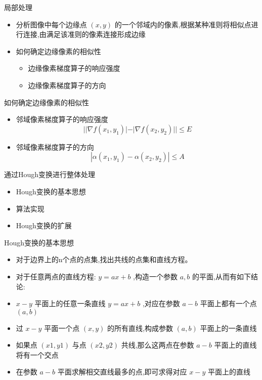 \documentclass[presentation]{beamer}
\begin{document}
\begin{frame}[label={sec:orgb7e85b8}]{局部处理}
\begin{itemize}
\item 分析图像中每个边缘点 \((x,y)\) 的一个邻域内的像素,根据某种准则将相似点进行连接,由满足该准则的像素连接形成边缘
\item 如何确定边缘像素的相似性
\begin{itemize}
\item 边缘像素梯度算子的响应强度
\item 边缘像素梯度算子的方向
\end{itemize}
\end{itemize}
\end{frame}
\begin{frame}[label={sec:org2362c99}]{如何确定边缘像素的相似性}
\begin{itemize}
\item 邻域像素梯度算子的响应强度
\[ ||\nabla f(x_1,y_1)|-|\nabla f(x_2,y_2)||\leq E \]
\item 邻域像素梯度算子的方向
\[ |\alpha(x_1,y_1)-\alpha(x_2,y_2)|\leq A  \]
\end{itemize}
\end{frame}

\begin{frame}[label={sec:org539962a}]{通过Hough变换进行整体处理}
\begin{itemize}
\item Hough变换的基本思想
\item 算法实现
\item Hough变换的扩展
\end{itemize}
\end{frame}

\begin{frame}[label={sec:orgce80d19}]{Hough变换的基本思想}
\begin{itemize}
\item 对于边界上的n个点的点集,找出共线的点集和直线方程。
\item 对于任意两点的直线方程: \(y=ax+b\) ,构造一个参数 \(a,b\) 的平面,从而有如下结论:
\item \(x-y\) 平面上的任意一条直线 \(y=ax+b\) ,对应在参数 \(a-b\) 平面上都有一个点 \((a,b)\)
\item 过 \(x-y\) 平面一个点 \((x,y)\) 的所有直线,构成参数 \((a,b)\) 平面上的一条直线
\item 如果点 \((x1,y1)\) 与点 \((x2,y2)\) 共线,那么这两点在参数 \(a-b\) 平面上的直线将有一个交点
\item 在参数 \(a-b\) 平面求解相交直线最多的点,即可求得对应 \(x-y\) 平面上的直线
\end{itemize}
\end{frame}
\end{document}
